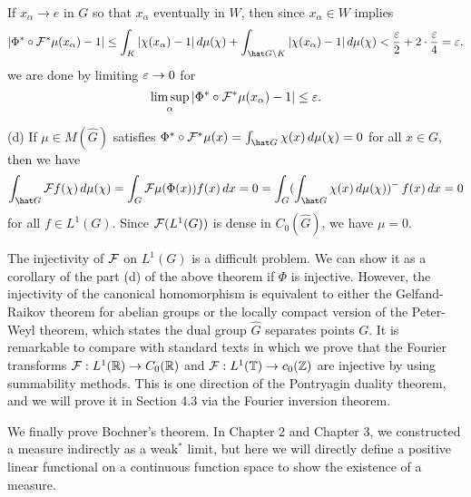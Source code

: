 \documentclass{../../small}
\begin{document}
\begin{pf}
If $x_\alpha\to e$ in $G$ so that $x_\alpha$ eventually in $W$, then since $x_\alpha\in W$ implies
\[|\Phi^*\circ\cF^*\mu(x_\alpha)-1|\le\int_K|\chi(x_\alpha)-1|\,d\mu(\chi)+\int_{\hat G\setminus K}|\chi(x_\alpha)-1|\,d\mu(\chi)<\frac\e2+2\cdot\frac\e4=\e,\]
we are done by limiting $\varepsilon\to0$ for
\[\limsup_\alpha|\Phi^*\circ\mathcal{F}^*\mu(x_\alpha)-1|\le\varepsilon.\]

(d)
If $\mu\in M(\hat G)$ satisfies $\Phi^*\circ\cF^*\mu(x)=\int_{\hat G}\chi(x)\,d\mu(\chi)=0$ for all $x\in G$, then we have
\[\int_{\hat G}\cF f(\chi)\,d\mu(\chi)=\int_G\cF\mu(\Phi(x))f(x)\,dx=0=\int_G(\int_{\hat G}\chi(x)\,d\mu(\chi))^-\,f(x)\,dx=0\]
for all $f\in L^1(G)$.
Since $\mathcal{F}(L^1(G))$ is dense in $C_0(\hat G)$, we have $\mu=0$.
\end{pf}

\begin{rmk}
The injectivity of $\mathcal{F}$ on $L^1(G)$ is a difficult problem.
We can show it as a corollary of the part (d) of the above theorem if $\Phi$ is injective.
However, the injectivity of the canonical homomorphism is equivalent to either the Gelfand-Raikov theorem for abelian groups or the locally compact version of the Peter-Weyl theorem, which states the dual group $\hat G$ separates points $G$.
It is remarkable to compare with standard texts in which we prove that the Fourier transforms $\mathcal{F}:L^1(\mathbb{R})\to C_0(\mathbb{R})$ and $\mathcal{F}:L^1(\mathbb{T})\to c_0(\mathbb{Z})$ are injective by using summability methods.
This is one direction of the Pontryagin duality theorem, and we will prove it in Section 4.3 via the Fourier inversion theorem.
\end{rmk}

We finally prove Bochner's theorem.
In Chapter 2 and Chapter 3, we constructed a measure indirectly as a weak$^*$ limit, but here we will directly define a positive linear functional on a continuous function space to show the existence of a measure.
\end{document}
